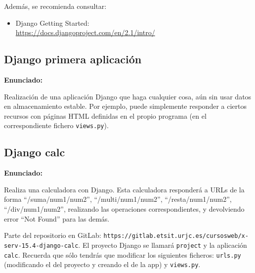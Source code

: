 Además, se recomienda consultar:

\begin{itemize}
\item Django Getting Started: \\
  \url{https://docs.djangoproject.com/en/2.1/intro/}
\end{itemize}

\subsection{Django primera aplicación}
\label{subsec:django-primera}

\textbf{Enunciado:}

Realización de una aplicación Django que haga cualquier cosa, aún sin usar datos en almacenamiento estable. Por ejemplo, puede simplemente responder a ciertos recursos con páginas HTML definidas en el propio programa (en el correspondiente fichero \texttt{views.py}).

\subsection{Django calc}
\label{subsec:django-calc}

\textbf{Enunciado:}

Realiza una calculadora con Django. Esta calculadora responderá a URLs de la forma ``/suma/num1/num2'', ``/multi/num1/num2'', ``/resta/num1/num2'', ``/div/num1/num2'', realizando las operaciones correspondientes, y devolviendo error ``Not Found'' para las demás.

Parte del repositorio en GitLab: \verb|https://gitlab.etsit.urjc.es/cursosweb/x-serv-15.4-django-calc|. El proyecto Django se llamará \texttt{project} y la aplicación \texttt{calc}. 
Recuerda que sólo tendrás que modificar los siguientes ficheros: \texttt{urls.py} (modificando el del proyecto y creando el de la app) y \texttt{views.py}. 

%

